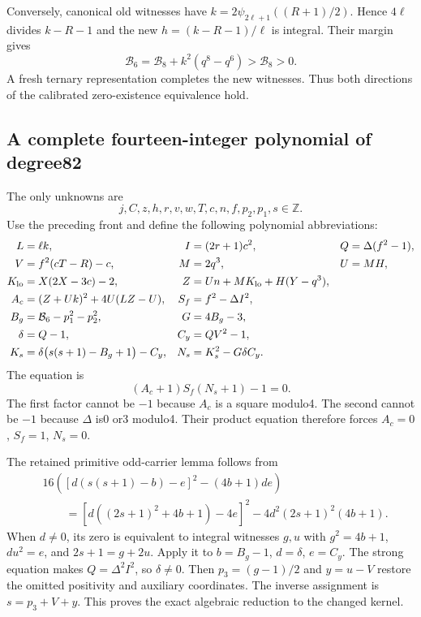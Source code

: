 Conversely, canonical old witnesses have
$k=2\psi_{2\ell+1}((R+1)/2)$. Hence $4\ell$ divides $k-R-1$ and the
new $h=(k-R-1)/\ell$ is integral. Their margin gives
\[
 \mathcal B_6=\mathcal B_8+k^2(q^8-q^6)>\mathcal B_8>0.
\]
A fresh ternary representation completes the new witnesses. Thus both
directions of the calibrated zero-existence equivalence hold.

\subsection{A complete fourteen-integer polynomial of degree82}
The only unknowns are
\[
 j,C,z,h,r,v,w,T,c,n,f,p_2,p_1,s\in\mathbb Z.
\]
Use the preceding front and define the following polynomial abbreviations:
\begin{align*}
 L&=\ell k,& I&=(2r+1)c^2,&Q&=\Delta(f^2-1),\\
 V&=f^2(cT-R)-c,& M&=2q^3,&U&=MH,\\
 K_{\rm lo}&=X(2X-3c)-2,
 &Z&=Un+MK_{\rm lo}+H(Y-q^3),\\
 A_c&=(Z+Uk)^2+4U(LZ-U),
 &S_f&=f^2-\Delta I^2,\\
 B_g&=\mathcal B_6-p_1^2-p_2^2,
 &G&=4B_g-3,\\
 \delta&=Q-1,&C_y&=QV^2-1,\\
 K_s&=\delta\bigl(s(s+1)-B_g+1\bigr)-C_y,
 &N_s&=K_s^2-G\delta C_y.
\end{align*}
The equation is
\begin{equation}\label{eq:integer82}
 \boxed{(A_c+1)S_f(N_s+1)-1=0.}
\end{equation}
The first factor cannot be $-1$ because $A_c$ is a square modulo4.
The second cannot be $-1$ because $\Delta$ is0 or3 modulo4.
Their product equation therefore forces $A_c=0$, $S_f=1$, $N_s=0$.

The retained primitive odd-carrier lemma follows from
\begin{align*}
 &16\left([d(s(s+1)-b)-e]^2-(4b+1)de\right)\\
 &\qquad=[d((2s+1)^2+4b+1)-4e]^2
       -4d^2(2s+1)^2(4b+1).
\end{align*}
When $d\ne0$, its zero is equivalent to integral witnesses $g,u$ with
$g^2=4b+1$, $du^2=e$, and $2s+1=g+2u$.
Apply it to $b=B_g-1$, $d=\delta$, $e=C_y$.
The strong equation makes $Q=\Delta^2I^2$, so $\delta\ne0$.
Then $p_3=(g-1)/2$ and $y=u-V$ restore the omitted positivity and
auxiliary coordinates. The inverse assignment is $s=p_3+V+y$.
This proves the exact algebraic reduction to the changed kernel.

